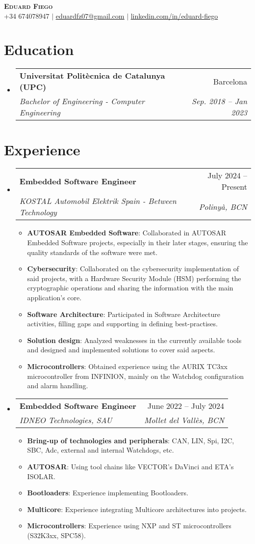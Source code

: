 \documentclass[letterpaper,11pt]{article}
\makeatletter
\newcommand{\resumeItem}[2]{
  \item\small{
    \textbf{#1}{: #2 \vspace{-2pt}}
}}
\newcommand{\resumeSubheading}[4]{
  \vspace{-2pt}\item
    \begin{tabular*}{0.97\textwidth}[t]{l@{\extracolsep{\fill}}r}
      \textbf{#1} & #2 \\
      \textit{\small#3} & \textit{\small #4} \\
    \end{tabular*}\vspace{-7pt}
}
\newcommand{\resumeSubHeadingListStart}{\begin{itemize}[leftmargin=0.15in, label={}]}
\newcommand{\resumeSubHeadingListEnd}{\end{itemize}}
\newcommand{\resumeItemListStart}{\begin{itemize}}
\newcommand{\resumeItemListEnd}{\end{itemize}\vspace{-5pt}}
\makeatother
\begin{document}

\begin{center}
    \textbf{\Huge \scshape Eduard Fiego} \\ \vspace{1pt}
    \small +34 674078947 $|$ \href{mailto:eduardfz07@gmail.com}{\underline{eduardfz07@gmail.com}} $|$
    \href{https://www.linkedin.com/in/eduard-fiego-737667237/}{\underline{linkedin.com/in/eduard-fiego}}
\end{center}


\section{Education}
  \resumeSubHeadingListStart
    \resumeSubheading
      {Universitat Politècnica de Catalunya (UPC)}{Barcelona}
      {Bachelor of Engineering - Computer Engineering}{Sep. 2018 -- Jan 2023}
  \resumeSubHeadingListEnd


\section{Experience}
  \resumeSubHeadingListStart

    \resumeSubheading
      {Embedded Software Engineer}{July 2024 -- Present}
      {KOSTAL Automobil Elektrik Spain - Between Technology}{Polinyà, BCN}
      \resumeItemListStart
        \resumeItem{AUTOSAR Embedded Software}
        {Collaborated in AUTOSAR Embedded Software projects, especially in their later stages, ensuring the quality standards of the software were met.}
        \resumeItem{Cybersecurity}
        {Collaborated on the cybersecurity implementation of said projects, with a Hardware Security Module (HSM) performing the cryptographic operations and sharing the information with the main application's core.}
        \resumeItem{Software Architecture}
        {Participated in Software Architecture activities, filling gaps and supporting in defining best-practises.}
        \resumeItem{Solution design}
        {Analyzed weaknesses in the currently available tools and designed and implemented solutions to cover said aspects.}
        \resumeItem{Microcontrollers}
        {Obtained experience using the AURIX TC3xx microcontroller from INFINION, mainly on the Watchdog configuration and alarm handling.}
      \resumeItemListEnd

    \resumeSubheading
      {Embedded Software Engineer}{June 2022 -- July 2024}
      {IDNEO Technologies, SAU}{Mollet del Vallès, BCN}
      \resumeItemListStart
        \resumeItem{Bring-up of technologies and peripherals}
        {CAN, LIN, Spi, I2C, SBC, Adc, external and internal Watchdogs, etc.}
        \resumeItem{AUTOSAR}{
        Using tool chains like VECTOR's DaVinci and ETA's ISOLAR.}
        \resumeItem{Bootloaders}{
        Experience implementing Bootloaders.}
        \resumeItem{Multicore}{
        Experience integrating Multicore architectures into projects.}
        \resumeItem{Microcontrollers}{
        Experience using NXP and ST microcontrollers (S32K3xx, SPC58).}
      \resumeItemListEnd
  \resumeSubHeadingListEnd
\end{document}
